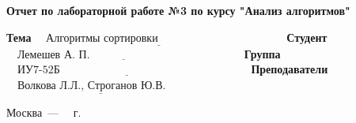 \begin{titlepage}
	
	\begin{center}
		\Large\textbf{Отчет по лабораторной работе №3 по курсу "Анализ алгоритмов"}
	\end{center}
	
	\noindent\textbf{Тема} $\underline{\text{~~~Алгоритмы сортировки~~~~~~~~~~~~~~~~~~~~~~~~~~~~~~~~~~}}$\newline\newline
	\noindent\textbf{Студент} $\underline{\text{~~~Лемешев А. П.~~~~~~~~~~~~~~~~~~~~~~~~~~~~~~~~~~~~~~~~~}}$\newline\newline
	\noindent\textbf{Группа} $\underline{\text{~~~ИУ7-52Б~~~~~~~~~~~~~~~~~~~~~~~~~~~~~~~~~~~~~~~~~~~~~~~~~~~}}$\newline\newline
	\noindent\textbf{Преподаватели} $\underline{\text{~~~Волкова Л.Л., Строганов Ю.В.~~~~~~~~}}$\newline
	
	\begin{center}
		\vfill
		Москва~---~\the\year
		~г.
	\end{center}
 \restoregeometry
\end{titlepage}
